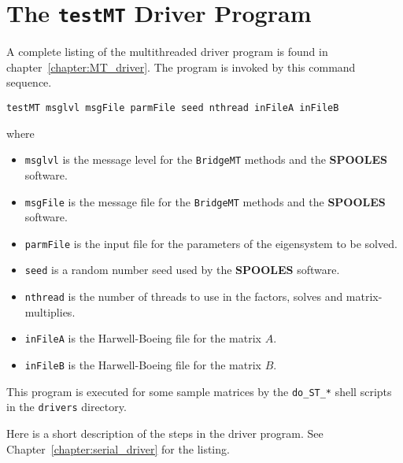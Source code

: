 \section{The \texttt{testMT} Driver Program}
\label{section:BridgeMT:driver}
\par
A complete listing of the multithreaded driver program is
found in chapter~\ref{chapter:MT_driver}.
The program is invoked by this command sequence.
\begin{verbatim}
testMT msglvl msgFile parmFile seed nthread inFileA inFileB
\end{verbatim}
where
\begin{itemize}
\item 
{\tt msglvl} is the message level for the {\tt BridgeMT}
methods and the {\bf SPOOLES} software.
\item 
{\tt msgFile} is the message file for the {\tt BridgeMT}
methods and the {\bf SPOOLES} software.
\item 
{\tt parmFile} is the input file for the parameters of the
eigensystem to be solved.
\item 
{\tt seed} is a random number seed
used by the {\bf SPOOLES} software.
\item 
{\tt nthread} is the number of threads to use in the factors,
solves and matrix-multiplies.
\item 
{\tt inFileA} is the Harwell-Boeing file for the matrix $A$.
\item 
{\tt inFileB} is the Harwell-Boeing file for the matrix $B$.
\end{itemize}
This program is executed for some sample matrices by the
{\tt do\_ST\_*} shell scripts in the {\tt drivers} directory.
\par
Here is a short description of the steps in the driver program.
See Chapter~\ref{chapter:serial_driver} for the listing.
